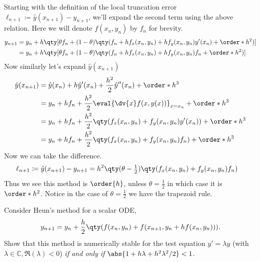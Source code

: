 \documentclass[boxes,pages]{homework}
\begin{document}
\begin{solution}
	Starting with the definition of the local truncation error $\ell_{n + 1}\coloneqq\hat{y}(x_{n+1}) - y_{n+1}$, we'll expand the second term using the above relation. Here we will denote $f(x_n, y_n)$ by $f_n$ for brevity.
	\begin{align*}
		y_{n + 1} & = y_n + h\qty[\theta f_n + (1 - \theta)\qty(f_n + hf_x(x_n, y_n) + hf_y(x_n, y_n)y'(x_n) + \order*{h^2})] \\
		          & = y_n + h\qty[\theta f_n + (1 - \theta)\qty(f_n + hf_x(x_n, y_n) + hf_y(x_n, y_n)f_n + \order*{h^2})]
	\end{align*}
	Now similarly let's expand $\hat{y}(x_{n+1})$
	\begin{align*}
		\hat{y}(x_{n+1}) & = \hat{y}(x_n) + h\hat{y}'(x_n) + \frac{h^2}{2}\hat{y}''(x_n) + \order*{h^3}          \\
		                 & = y_n + hf_n + \frac{h^2}{2}\eval{\dv{x}f(x, y(x))}_{x=x_n} + \order*{h^3}            \\
		                 & = y_n + hf_n + \frac{h^2}{2}\qty(f_x(x_n, y_n) + f_y(x_n, y_n)y'(x_n)) + \order*{h^3} \\
		                 & = y_n + hf_n + \frac{h^2}{2}\qty(f_x(x_n, y_n) + f_y(x_n, y_n)f_n) + \order*{h^3}
	\end{align*}
	Now we can take the difference.
	\begin{align*}
		\ell_{n + 1} & \coloneqq\hat{y}(x_{n+1}) - y_{n+1} = h^2\qty(\theta - \tfrac{1}{2})\qty(f_x(x_n, y_n) + f_y(x_n, y_n)f_n)
	\end{align*}
	Thus we see this method is $\order{h}$, unless $\theta = \frac{1}{2}$ in which case it is $\order*{h^2}$. Notice in the case of $\theta = \frac{1}{2}$ we have the trapezoid rule.
\end{solution}

\begin{problem}
Consider Heun's method for a scalar ODE,
\[y_{n+1} = y_n + \frac{h}{2}\qty(f(x_n,y_n) + f(x_{n+1}, y_n + hf(x_n, y_n))).\]
Show that this method is numerically stable for the test equation $y' = \lambda y$ (with $\lambda\in\mathbb{C}, \Re(\lambda) < 0$) \emph{if and only if} $\abs{1 + h\lambda + h^2\lambda^2 / 2} < 1$.
\end{problem}
\end{document}
